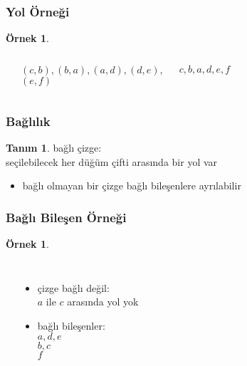 \documentclass[dvipsnames]{beamer}
\theoremstyle{definition}
\newtheorem{tanim}[theorem]{Tanım}
\theoremstyle{example}
\newtheorem{ornek}[theorem]{Örnek}
\theoremstyle{plain}
\newtheorem{teorem}[theorem]{Teorem}
\begin{document}
\begin{frame}
  \frametitle{Yol Örneği}

  \begin{ornek}
    \begin{columns}
      \begin{center}
      \end{center}

      $(c,b),(b,a),(a,d),(d,e),$\\
      $(e,f)$

      \medskip
      $c,b,a,d,e,f$
    \end{columns}
  \end{ornek}
\end{frame}
%
%

\begin{frame}
  \frametitle{Bağlılık}

  \begin{tanim}
    \alert{bağlı çizge}:\\
    seçilebilecek her düğüm çifti arasında bir yol var
  \end{tanim}

  \pause
  \begin{itemize}
    \item bağlı olmayan bir çizge bağlı bileşenlere ayrılabilir
  \end{itemize}
\end{frame}

\begin{frame}
  \frametitle{Bağlı Bileşen Örneği}

  \begin{ornek}
    \begin{columns}
      \begin{center}
      \end{center}

      \pause
      \begin{itemize}
        \item çizge bağlı değil:\\
          $a$ ile $c$ arasında yol yok
        \item bağlı bileşenler:\\
          $a,d,e$\\
          $b,c$\\
          $f$
      \end{itemize}
    \end{columns}
  \end{ornek}
\end{frame}
\end{document}

